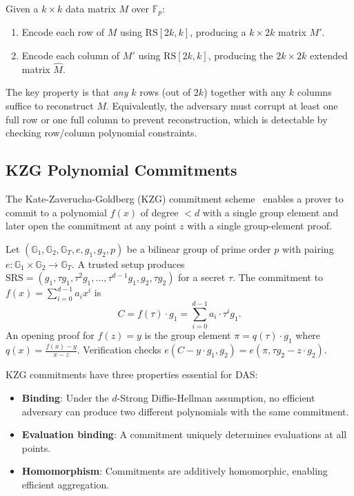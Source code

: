 \begin{definition}[2D RS Extension]
Given a $k \times k$ data matrix $M$ over $\mathbb{F}_p$:
\begin{enumerate}
    \item Encode each row of $M$ using $\text{RS}[2k, k]$, producing a $k \times 2k$ matrix $M'$.
    \item Encode each column of $M'$ using $\text{RS}[2k, k]$, producing the $2k \times 2k$
          extended matrix $\hat{M}$.
\end{enumerate}
\end{definition}

The key property is that \emph{any} $k$ rows (out of $2k$) together with any $k$ columns
suffice to reconstruct $M$. Equivalently, the adversary must corrupt at least one full row
or one full column to prevent reconstruction, which is detectable by checking row/column
polynomial constraints.

\subsection{KZG Polynomial Commitments}
\label{sec:background:kzg}

The Kate-Zaverucha-Goldberg (KZG) commitment scheme~\cite{kate2010commitment} enables
a prover to commit to a polynomial $f(x)$ of degree $< d$ with a single group element
and later open the commitment at any point $z$ with a single group-element proof.

\begin{definition}
Let $(\mathbb{G}_1, \mathbb{G}_2, \mathbb{G}_T, e, g_1, g_2, p)$ be a bilinear group of
prime order $p$ with pairing $e : \mathbb{G}_1 \times \mathbb{G}_2 \to \mathbb{G}_T$.
A trusted setup produces $\text{SRS} = (g_1, \tau g_1, \tau^2 g_1, \ldots, \tau^{d-1} g_1,
g_2, \tau g_2)$ for a secret $\tau$. The commitment to $f(x) = \sum_{i=0}^{d-1} a_i x^i$ is
\[
    C = f(\tau) \cdot g_1 = \sum_{i=0}^{d-1} a_i \cdot \tau^i g_1.
\]
An opening proof for $f(z) = y$ is the group element
$\pi = q(\tau) \cdot g_1$ where $q(x) = \frac{f(x) - y}{x - z}$.
Verification checks $e(C - y \cdot g_1, g_2) = e(\pi, \tau g_2 - z \cdot g_2)$.
\end{definition}

KZG commitments have three properties essential for DAS:
\begin{itemize}[leftmargin=*]
    \item \textbf{Binding}: Under the $d$-Strong Diffie-Hellman assumption, no efficient adversary
          can produce two different polynomials with the same commitment.
    \item \textbf{Evaluation binding}: A commitment uniquely determines evaluations at all points.
    \item \textbf{Homomorphism}: Commitments are additively homomorphic, enabling efficient
          aggregation.
\end{itemize}

